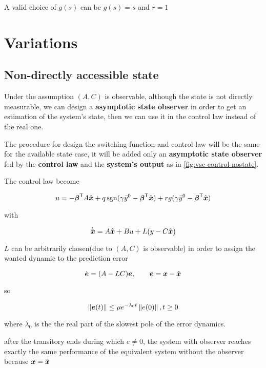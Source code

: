 A valid choice of $g(s)$ can be $g(s) = s$ and $r=1$

\section{Variations}

\subsection{Non-directly accessible state}

Under the assumption $(A,C)$ is observable, although the state is not directly measurable, we can design a \textbf{asymptotic state observer} in order to get an estimation of the system's state, then we can use it in the control law instead of the real one.

The procedure for design the switching function and control law will be the same for the available state case, it will be added only an \textbf{asymptotic state observer} fed by the \textbf{control law} and the \textbf{system's output} as in \cref{fig:vsc-control-nostate}.

The control law become

\[
    u = - \boldsymbol{\beta}^{\mathsf{T}} A \hat{\boldsymbol{x}} + q \operatorname{sgn}(\gamma \bar y^0 - \boldsymbol{\beta}^{\mathsf{T}} \hat{\boldsymbol{x}}) + r g(\gamma \bar y^0 - \boldsymbol{\beta}^{\mathsf{T}} \hat{\boldsymbol{x}})
\]

with

\[
    \dot{\hat{\boldsymbol{x}}} = A\hat{\boldsymbol{x}} + Bu + L(y - C\hat{\boldsymbol{x}})
\]

$L$ can be arbitrarily chosen(due to $(A,C)$ is observable) in order to assign the wanted dynamic to the prediction error

\[
    \dot{\boldsymbol{e}} = (A - LC) \boldsymbol{e}, \qquad \boldsymbol{e} = \boldsymbol{x} - \hat{\boldsymbol{x}}
\]

so

\[
    \left\lVert\boldsymbol{e}(t)\right\rVert \leq \mu e^{-\lambda_0 t}\left\lVert e(0)\right\rVert, t \geq 0
\]

where $\lambda_0$ is the the real part of the slowest pole of the error dynamics.

\begin{nb}after the transitory ends during which $e\ne 0$, the system with observer reaches exactly the same performance of the equivalent system without the observer because $\boldsymbol{x} = \hat{\boldsymbol{x}}$\end{nb}

